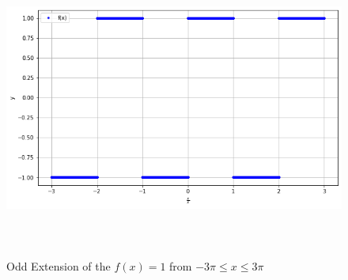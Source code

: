 \documentclass[12pt,a4paper]{article}
\begin{document}
\begin{enumerate}
			\begin{figure}[!h]
			\includegraphics[width=430pt,  height=280pt]{./graphics/q3a2.png}
			\caption{Odd Extension of the $f(x)=1$ from $-3\pi \leq x  \leq 3\pi$}
		\end{figure}
	

\end{enumerate}
\end{document}
